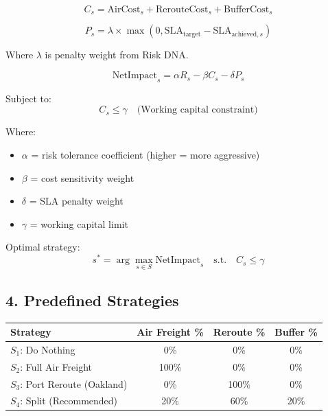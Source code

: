\documentclass[11pt]{article}
\begin{document}
\begin{equation}
C_s = \text{AirCost}_s + \text{RerouteCost}_s + \text{BufferCost}_s
\end{equation}

\begin{equation}
P_s = \lambda \times \max(0, \text{SLA}_{\text{target}} - \text{SLA}_{\text{achieved},s})
\end{equation}

Where $\lambda$ is penalty weight from Risk DNA.

\begin{equation}
\text{NetImpact}_s = \alpha R_s - \beta C_s - \delta P_s
\end{equation}

Subject to:
\begin{equation}
C_s \leq \gamma \quad \text{(Working capital constraint)}
\end{equation}

Where:
\begin{itemize}
    \item $\alpha$ = risk tolerance coefficient (higher = more aggressive)
    \item $\beta$ = cost sensitivity weight
    \item $\delta$ = SLA penalty weight
    \item $\gamma$ = working capital limit
\end{itemize}

Optimal strategy:
\begin{equation}
s^* = \arg\max_{s \in S} \text{NetImpact}_s \quad \text{s.t.} \quad C_s \leq \gamma
\end{equation}

\subsection{4. Predefined Strategies}

\begin{center}
\begin{tabular}{lccc}
\toprule
\textbf{Strategy} & \textbf{Air Freight \%} & \textbf{Reroute \%} & \textbf{Buffer \%} \\
\midrule
$S_1$: Do Nothing & 0\% & 0\% & 0\% \\
$S_2$: Full Air Freight & 100\% & 0\% & 0\% \\
$S_3$: Port Reroute (Oakland) & 0\% & 100\% & 0\% \\
$S_4$: Split (Recommended) & 20\% & 60\% & 20\% \\
\bottomrule
\end{tabular}
\end{center}
\end{document}
